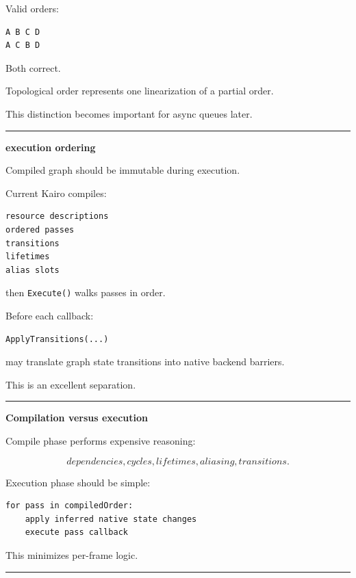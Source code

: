 Valid orders:

\begin{verbatim}
A B C D
A C B D
\end{verbatim}

Both correct.

Topological order represents one linearization of a partial order.

This distinction becomes important for async queues later.

\begin{center}\rule{0.5\linewidth}{0.5pt}\end{center}

\textbf{execution ordering}

Compiled graph should be immutable during execution.

Current Kairo compiles:

\begin{verbatim}
resource descriptions
ordered passes
transitions
lifetimes
alias slots
\end{verbatim}

then \texttt{Execute()} walks passes in order.

Before each callback:

\begin{verbatim}
ApplyTransitions(...)
\end{verbatim}

may translate graph state transitions into native backend barriers.

This is an excellent separation.

\begin{center}\rule{0.5\linewidth}{0.5pt}\end{center}

\textbf{Compilation versus execution}

Compile phase performs expensive reasoning:

\[
dependencies,
cycles,
lifetimes,
aliasing,
transitions.
\]

Execution phase should be simple:

\begin{verbatim}
for pass in compiledOrder:
    apply inferred native state changes
    execute pass callback
\end{verbatim}

This minimizes per-frame logic.

\begin{center}\rule{0.5\linewidth}{0.5pt}\end{center}

